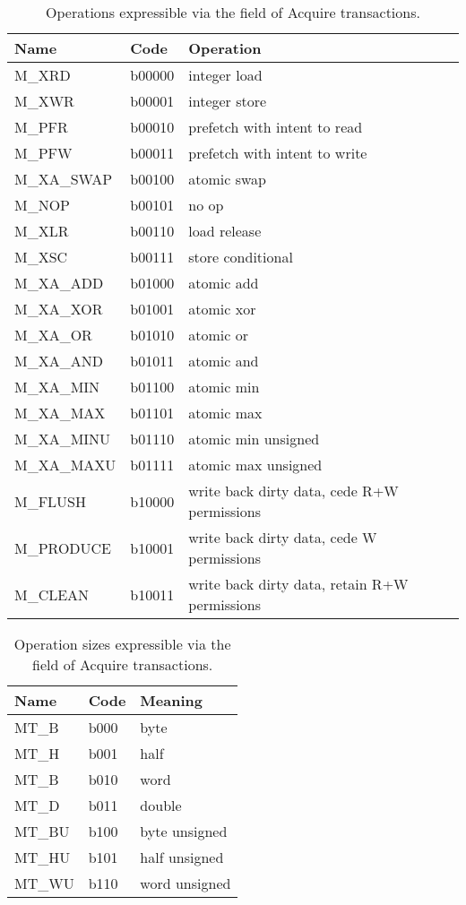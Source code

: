 \begin{table}
\centering
\begin{tabular}{|l|l|l|}
\hline
Name  & Code & Operation \\ \hline \hline
M\_XRD      & b00000 & integer load \\ \hline 
M\_XWR      & b00001 & integer store \\ \hline 
M\_PFR      & b00010 & prefetch with intent to read \\ \hline 
M\_PFW      & b00011 & prefetch with intent to write \\ \hline 
M\_XA\_SWAP & b00100 & atomic swap \\ \hline 
M\_NOP      & b00101 & no op \\ \hline 
M\_XLR      & b00110 & load release \\ \hline 
M\_XSC      & b00111 & store conditional \\ \hline 
M\_XA\_ADD  & b01000 & atomic add \\ \hline 
M\_XA\_XOR  & b01001 & atomic xor \\ \hline 
M\_XA\_OR   & b01010 & atomic or \\ \hline 
M\_XA\_AND  & b01011 & atomic and \\ \hline 
M\_XA\_MIN  & b01100 & atomic min \\ \hline 
M\_XA\_MAX  & b01101 & atomic max \\ \hline 
M\_XA\_MINU & b01110 & atomic min unsigned \\ \hline 
M\_XA\_MAXU & b01111 & atomic max unsigned \\ \hline 
M\_FLUSH    & b10000 & write back dirty data, cede R+W permissions \\ \hline 
M\_PRODUCE  & b10001 & write back dirty data, cede W permissions \\ \hline 
M\_CLEAN    & b10011 & write back dirty data, retain R+W permissions \\ \hline
\end{tabular}
\caption{Operations expressible via the  field of Acquire transactions.}
\label{tab:opcodes}
\end{table}

\begin{table}
\centering
\begin{tabular}{|l|l|l|}
\hline
Name  & Code & Meaning \\ \hline \hline
MT\_B & b000 & byte \\ \hline
MT\_H & b001 & half \\ \hline
MT\_B & b010 & word \\ \hline
MT\_D & b011 & double \\ \hline
MT\_BU & b100 & byte unsigned \\ \hline
MT\_HU & b101 & half unsigned \\ \hline
MT\_WU & b110 & word unsigned \\ \hline
\end{tabular}
\caption{Operation sizes expressible via the  field of Acquire transactions.}
\label{tab:opsizes}
\end{table}

